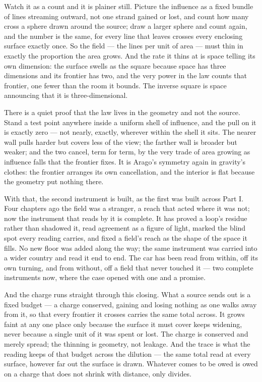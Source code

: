 Watch it as a count and it is plainer still. Picture the influence as a fixed bundle of lines streaming
outward, not one strand gained or lost, and count how many cross a sphere drawn around the source; draw a larger
sphere and count again, and the number is the same, for every line that leaves crosses every enclosing surface
exactly once. So the field --- the lines per unit of area --- must thin in exactly the proportion the area
grows. And the rate it thins at is space telling its own dimension: the surface swells as the square because
space has three dimensions and its frontier has two, and the very power in the law counts that frontier, one
fewer than the room it bounds. The inverse square is space announcing that it is three-dimensional.

There is a quiet proof that the law lives in the geometry and not the source. Stand a test point anywhere inside
a uniform shell of influence, and the pull on it is exactly zero --- not nearly, exactly, wherever within the
shell it sits. The nearer wall pulls harder but covers less of the view; the farther wall is broader but weaker;
and the two cancel, term for term, by the very trade of area growing as influence falls that the frontier fixes.
It is Arago's symmetry again in gravity's clothes: the frontier arranges its own cancellation, and the interior
is flat because the geometry put nothing there.

With that, the second instrument is built, as the first was built across Part I. Four chapters ago the field was
a stranger, a reach that acted where it was not; now the instrument that reads by it is complete. It has proved
a loop's residue rather than shadowed it, read agreement as a figure of light, marked the blind spot every
reading carries, and fixed a field's reach as the shape of the space it fills. No new floor was added along the
way; the same instrument was carried into a wider country and read it end to end. The car has been read from
within, off its own turning, and from without, off a field that never touched it --- two complete instruments
now, where the case opened with one and a promise.

And the charge runs straight through this closing. What a source sends out is a fixed budget --- a charge
conserved, gaining and losing nothing as one walks away from it, so that every frontier it crosses carries the
same total across. It grows faint at any one place only because the surface it must cover keeps widening, never
because a single unit of it was spent or lost. The charge is conserved and merely spread; the thinning is
geometry, not leakage. And the trace is what the reading keeps of that budget across the dilution --- the same
total read at every surface, however far out the surface is drawn. Whatever comes to be owed is owed on a charge
that does not shrink with distance, only divides.

